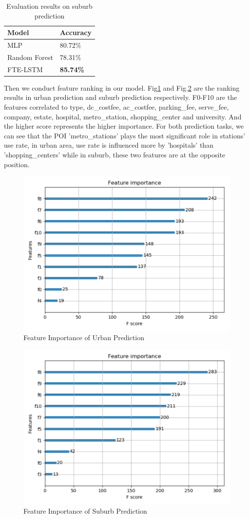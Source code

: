 \documentclass[runningheads]{llncs}
\begin{document}
\begin{table}[htbp]
	\caption{Evaluation results on suburb prediction}
	\begin{center}
		\begin{tabular}{|l|l|}
			\hline
			Model & Accuracy\\
			\hline
			MLP & 80.72\%\\
			\hline
			Random Forest & 78.31\%\\
			\hline
			FTE-LSTM & \textbf{85.74\%}\\
			\hline
		\end{tabular}
		\label{tab3}
	\end{center}
\end{table}
Then we conduct feature ranking in our model. Fig\ref{fig9} and Fig.\ref{fig10} are the ranking results in urban prediction and suburb prediction respectively. F0-F10 are the features correlated to type, dc\_costfee, ac\_costfee, parking\_fee, serve\_fee, company, estate, hospital, metro\_station, shopping\_center and university. And the higher score represents the higher importance. For both prediction tasks, we can see that the POI 'metro\_stations' plays the most significant role in stations' use rate, in urban area, use rate is influenced more by 'hospitals' than 'shopping\_centers' while in suburb, these two features are at the opposite position.
\begin{figure}[htbp]
	\includegraphics[width=0.7\columnwidth]{./figures/urban_rank.pdf}
	\centering
	\caption{Feature Importance of Urban Prediction}
	\label{fig9}
\end{figure}

\begin{figure}[!htp]
	\includegraphics[width=0.7\columnwidth]{./figures/subur_rank.pdf}
	\centering
	\caption{Feature Importance of Suburb Prediction}
	\label{fig10}
\end{figure}
\end{document}
